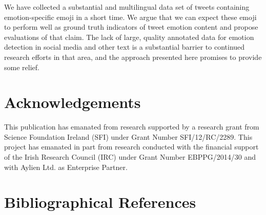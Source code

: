 \documentclass[10pt, a4paper]{article}
\begin{document}
We have collected a substantial and multilingual data set of tweets containing emotion-specific emoji in a short time. We argue that we can expect these emoji to perform well as ground truth indicators of tweet emotion content and propose evaluations of that claim. 
The lack of large, quality annotated data for emotion detection in social media and other text is a substantial barrier to continued research efforts in that area, and the approach presented here promises to provide some relief.

\section*{Acknowledgements}

This publication has emanated from research supported by a research grant from Science Foundation Ireland (SFI) under Grant Number SFI/12/RC/2289.
This project has emanated in part from research conducted with the financial support of the Irish Research Council (IRC) under Grant Number EBPPG/2014/30 and with Aylien Ltd. as Enterprise Partner. 

\section{Bibliographical References}
\label{m%
%
%
ain:ref}


% 

\end{document}
